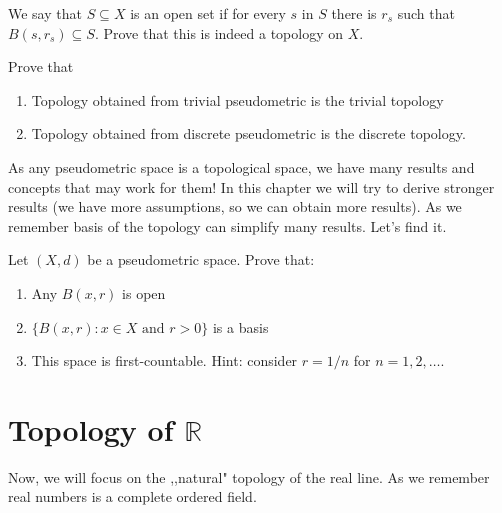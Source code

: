\begin{prob}
	We say that $S\subseteq X$ is an open set if for every $s$ in $S$ there is $r_s$ such that $B(s,r_s)\subseteq S$.
	Prove that this is indeed a topology on $X$.
\end{prob}

\begin{prob}
	Prove that
	\begin{enumerate}
		\item Topology obtained from trivial pseudometric is the trivial topology
		\item Topology obtained from discrete pseudometric is the discrete topology.
	\end{enumerate}
\end{prob}

As any pseudometric space is a topological space, we have many results and concepts that may work for them! In this chapter we will try to derive
stronger results (we have more assumptions, so we can obtain more results). As we remember basis of the topology can simplify many results. Let's
find it.

\begin{prob}
	Let $(X,d)$ be a pseudometric space. Prove that:
	\begin{enumerate}
		\item Any $B(x,r)$ is open
		\item $\{B(x,r) : x\in X \text{ and }r > 0\}$ is a basis
		\item This space is first-countable. Hint: consider $r=1/n$ for $n=1,2,\dots$.
	\end{enumerate}
\end{prob}

\section{Topology of $\mathbb R$}
Now, we will focus on the ,,natural" topology of the real line. As we remember
real numbers is a complete ordered field. 




